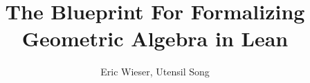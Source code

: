 \title{The Blueprint For Formalizing Geometric Algebra in Lean}

\author{Eric Wieser, Utensil Song}

